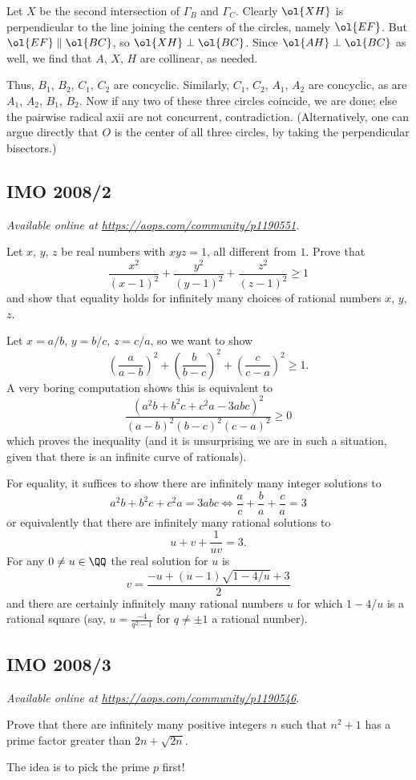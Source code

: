 \documentclass[11pt]{scrartcl}
\begin{document}
Let $X$ be the second intersection of $\Gamma_B$ and $\Gamma_C$.
Clearly $\ol{XH}$ is perpendicular to the line
joining the centers of the circles, namely $\ol{EF}$.
But $\ol{EF} \parallel \ol{BC}$, so $\ol{XH} \perp \ol{BC}$.
Since $\ol{AH} \perp \ol{BC}$ as well,
we find that $A$, $X$, $H$ are collinear, as needed.

Thus, $B_1$, $B_2$, $C_1$, $C_2$ are concyclic.
Similarly, $C_1$, $C_2$, $A_1$, $A_2$ are concyclic,
as are $A_1$, $A_2$, $B_1$, $B_2$.
Now if any two of these three circles coincide, we are done;
else the pairwise radical axii are not concurrent, contradiction.
(Alternatively, one can argue directly that $O$ is the center of all
three circles, by taking the perpendicular bisectors.)
\pagebreak

\subsection{IMO 2008/2}
\textsl{Available online at \url{https://aops.com/community/p1190551}.}
\begin{mdframed}[style=mdpurplebox,frametitle={Problem statement}]
Let $x$, $y$, $z$ be real numbers with $xyz = 1$,
all different from $1$.
Prove that
\[ \frac{x^2}{(x-1)^2} + \frac{y^2}{(y-1)^2}
+ \frac{z^2}{(z-1)^2} \ge 1 \]
and show that equality holds for infinitely many choices
of rational numbers $x$, $y$, $z$.
\end{mdframed}
Let $x=a/b$, $y=b/c$, $z=c/a$, so we want to show
\[ \left(\frac{a}{a-b}\right)^2+\left(\frac{b}{b-c}\right)^2
  +\left(\frac{c}{c-a}\right)^2\ge 1.\]
A very boring computation shows this is equivalent to
\[ \frac{(a^2b+b^2c+c^2a-3abc)^2}%
  {(a-b)^2(b-c)^2(c-a)^2}\ge 0\]
which proves the inequality
(and it is unsurprising we are in such a situation,
given that there is an infinite curve of rationals).

For equality, it suffices to show there are infinitely
many integer solutions to
\[ a^2b+b^2c+c^2a=3abc
  \iff \frac ac + \frac ba + \frac ca = 3
\]
or equivalently that
there are infinitely many rational solutions to
\[ u + v + \frac{1}{uv} = 3. \]
For any $0 \neq u \in \QQ$ the real solution for $u$ is
\[ v = \frac{-u + (u-1)\sqrt{1-4/u} + 3}{2} \]
and there are certainly infinitely many rational numbers $u$
for which $1-4/u$ is a rational square
(say, $u = \frac{-4}{q^2-1}$ for $q \neq \pm 1$ a rational number).
\pagebreak

\subsection{IMO 2008/3}
\textsl{Available online at \url{https://aops.com/community/p1190546}.}
\begin{mdframed}[style=mdpurplebox,frametitle={Problem statement}]
Prove that there are infinitely many positive integers $n$
such that $n^2+1$ has a prime factor greater than $2n + \sqrt{2n}$.
\end{mdframed}
The idea is to pick the prime $p$ first!
\end{document}
